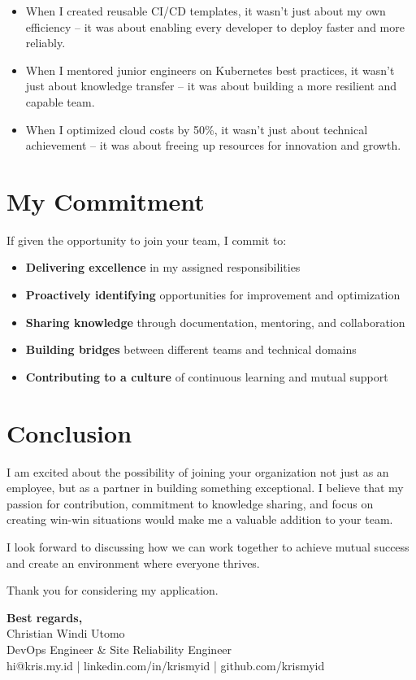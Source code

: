 \documentclass[11pt,a4paper]{article}
\begin{document}
\begin{itemize}[leftmargin=*, itemsep=4pt]
    \item When I created reusable CI/CD templates, it wasn't just about my own efficiency – it was about enabling every developer to deploy faster and more reliably.
    \item When I mentored junior engineers on Kubernetes best practices, it wasn't just about knowledge transfer – it was about building a more resilient and capable team.
    \item When I optimized cloud costs by 50\%, it wasn't just about technical achievement – it was about freeing up resources for innovation and growth.
\end{itemize}

\section{My Commitment}

If given the opportunity to join your team, I commit to:
\begin{itemize}[leftmargin=*, itemsep=4pt]
    \item \textbf{Delivering excellence} in my assigned responsibilities
    \item \textbf{Proactively identifying} opportunities for improvement and optimization
    \item \textbf{Sharing knowledge} through documentation, mentoring, and collaboration
    \item \textbf{Building bridges} between different teams and technical domains
    \item \textbf{Contributing to a culture} of continuous learning and mutual support
\end{itemize}

\section{Conclusion}

I am excited about the possibility of joining your organization not just as an employee, but as a partner in building something exceptional. I believe that my passion for contribution, commitment to knowledge sharing, and focus on creating win-win situations would make me a valuable addition to your team.

I look forward to discussing how we can work together to achieve mutual success and create an environment where everyone thrives.

Thank you for considering my application.

\vspace{1em}

\textbf{Best regards,}\\[0.5em]
Christian Windi Utomo\\
DevOps Engineer \& Site Reliability Engineer\\
hi@kris.my.id | linkedin.com/in/krismyid | github.com/krismyid
\end{document}
